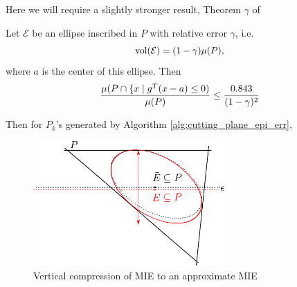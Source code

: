 \noindent
Here we will require a slightly stronger result, Theorem $\gamma$ of
\cite{tarasov1988method}

\begin{lem} \label{lem:approx-MIE-vol} 
Let $\mathcal{E}$ be an ellipse inscribed in $P$ with relative error
$\gamma$, i.e.
$$
\textnormal{vol}(\mathcal{E})=(1-\gamma)\mu(P),
$$
where $a$ is the center of this ellipse. Then
\[ 
\frac{\mu(P\cap\{x\mid g^{T}(x-a)\leq0)}{\mu(P)}\leq\frac{0.843}{(1-\gamma)^2}
\]
\end{lem}
\noindent Then for $P_k$'s generated by Algorithm \ref{alg:cutting_plane_epi_err},

\begin{figure}
\begin{centering}
\includegraphics[width=0.65\textwidth]{cutting/fig2}
\par\end{centering}
\caption{Vertical compression of MIE to an approximate MIE}
\end{figure}

